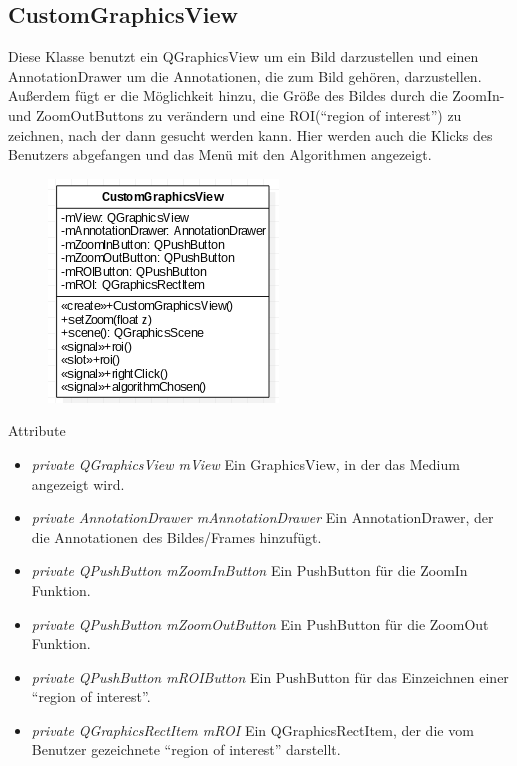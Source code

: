 \subsection*{CustomGraphicsView}
Diese Klasse benutzt ein QGraphicsView um ein Bild darzustellen und einen AnnotationDrawer um die Annotationen, die zum Bild gehören, darzustellen. Außerdem fügt er die Möglichkeit hinzu, die Größe des Bildes durch die ZoomIn- und ZoomOutButtons zu verändern und eine ROI(\enquote{region of interest}) zu zeichnen, nach der dann gesucht werden kann. Hier werden auch die Klicks des Benutzers abgefangen und das Menü mit den Algorithmen angezeigt.

\begin{figure}[H]
	\centering
	\includegraphics[scale=0.5]{img/Klassendiagramm/Klassen/View/CustomGraphicsView}
	\label{fig:customGraphicsView}
\end{figure}

Attribute
\begin{itemize}
	\item\textit{private QGraphicsView mView} 
	Ein GraphicsView, in der das Medium angezeigt wird. 
	\item\textit{private AnnotationDrawer mAnnotationDrawer} 
	Ein AnnotationDrawer, der die Annotationen des Bildes/Frames hinzufügt. 
	\item\textit{private QPushButton mZoomInButton} 
	Ein PushButton für die ZoomIn Funktion. 
	\item\textit{private QPushButton mZoomOutButton} 
	Ein PushButton für die ZoomOut Funktion.
	\item\textit{private QPushButton mROIButton} 
	Ein PushButton für das Einzeichnen einer \enquote{region of interest}.
	\item\textit{private QGraphicsRectItem mROI} 
	Ein QGraphicsRectItem, der die vom Benutzer gezeichnete \enquote{region of interest} darstellt.
\end{itemize}

